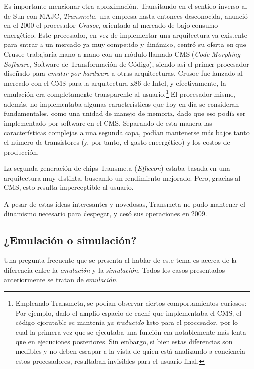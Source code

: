 \documentclass[11pt,fleqn]{book} %
\begin{document}
Es importante  mencionar otra aproximación. Transitando en el sentido 
inverso al de Sun con MAJC, \emph{Transmeta}, una empresa hasta entonces 
desconocida, anunció en el 2000 el procesador \emph{Crusoe}, orientado al 
mercado de bajo consumo energético. Este procesador, en vez de implementar 
una arquitectura ya existente para entrar a un mercado ya muy competido 
y dinámico, centró su oferta en que Crusoe trabajaría mano a mano con un módulo llamado
CMS (\emph{Code Morphing Software}, Software de Transformación de Código),
siendo así el primer procesador diseñado para \emph{emular por hardware} a
otras arquitecturas. Crusoe fue lanzado al mercado con el CMS para la
arquitectura x86 de Intel, y efectivamente, la emulación era
completamente transparente al usuario.\footnote{Empleando Transmeta, se
podían observar ciertos comportamientos curiosos: Por ejemplo, dado el
amplio espacio de caché que implementaba el CMS, el código ejecutable
se mantenía \emph{ya traducido} listo para el procesador, por lo cual la
primera vez que se ejecutaba una función era notablemente más lenta
que en ejecuciones posteriores. Sin embargo, si bien estas diferencias
son medibles y no deben escapar a la vista de quien está analizando a
conciencia estos procesadores, resultaban invisibles para el usuario
final. } El procesador mismo, además, no implementaba algunas
características que hoy en día se consideran fundamentales, como una
unidad de manejo de memoria, dado que eso podía ser implementado por
software en el CMS. Separando de esta manera las características
complejas a una segunda capa, podían mantenerse más bajos tanto el
número de transistores (y, por tanto, el gasto eneergético) y los
costos de producción.

La segunda generación de chips Transmeta (\emph{Efficeon}) estaba basada
en una arquitectura muy distinta, buscando un rendimiento mejorado.
Pero, gracias al CMS, esto resulta imperceptible al usuario.

A pesar de estas ideas interesantes y novedosas, Transmeta no pudo
mantener el dinamismo necesario para despegar, y cesó sus operaciones
en 2009.
\subsection{¿Emulación o simulación?}
\label{sec-9-2-3}


Una pregunta frecuente que se presenta al hablar de este tema es
acerca de la diferencia entre la \emph{emulación} y la \emph{simulación}. Todos
los casos presentados anteriormente se tratan de \emph{emulación}.
\end{document}
